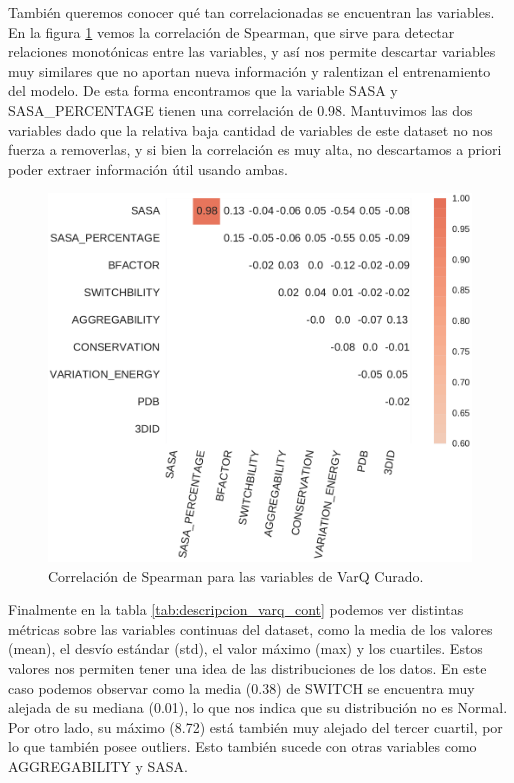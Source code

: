 También queremos conocer qué tan correlacionadas se encuentran las variables. En la figura \ref{fig:varq_corrplot} vemos la correlación de Spearman, que sirve para detectar relaciones monotónicas entre las variables, y así nos permite descartar variables muy similares que no aportan nueva información y ralentizan el entrenamiento del modelo. De esta forma encontramos que la variable SASA y SASA\_PERCENTAGE tienen una correlación de 0.98. Mantuvimos las dos variables dado que la relativa baja cantidad de variables de este dataset no nos fuerza a removerlas, y si bien la correlación es muy alta, no descartamos a priori poder extraer información útil usando ambas.

\begin{figure}[H]
    \centering
    \includegraphics[scale=0.6]{documents/latex/figures/3/varq/varq_corrplot.pdf}
    \caption{Correlación de Spearman para las variables de VarQ Curado.}
    \label{fig:varq_corrplot}
\end{figure}

Finalmente en la tabla \ref{tab:descripcion_varq_cont} podemos ver distintas métricas sobre las variables continuas del dataset, como la media de los valores (mean), el desvío estándar (std), el valor máximo (max) y los cuartiles. Estos valores nos permiten tener una idea de las distribuciones de los datos. En este caso podemos observar como la media (0.38) de SWITCH se encuentra muy alejada de su mediana (0.01), lo que nos indica que su distribución no es Normal. Por otro lado, su máximo (8.72) está también muy alejado del tercer cuartil, por lo que también posee outliers. Esto también sucede con otras variables como AGGREGABILITY y SASA.

